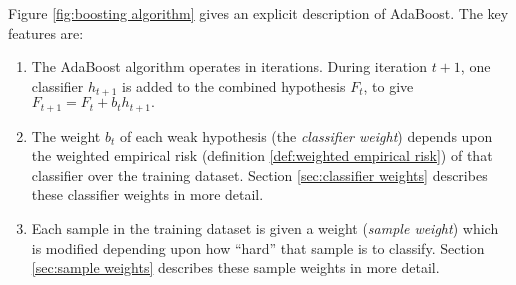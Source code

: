 Figure \ref{fig:boosting algorithm} gives an explicit description of
AdaBoost.  The key features are:
%
\begin{enumerate}
\item	The AdaBoost algorithm operates in iterations.  During
	iteration $t+1$, one classifier $h_{t+1}$ is added to the combined
	hypothesis $F_{t}$, to give $F_{t+1} = F_t + b_t h_{t+1}.$
\item	The weight $b_t$ of each weak hypothesis (the \emph{classifier
	weight}) depends upon the weighted empirical risk
	(definition \ref{def:weighted empirical risk}) of that
	classifier over the training dataset.  Section
	\ref{sec:classifier weights} describes these classifier
	weights in more detail.
\item	Each sample in the training dataset is given a weight
	(\emph{sample weight}) which is modified depending upon how
	``hard'' that sample is to classify.  Section \ref{sec:sample
	weights} describes these sample weights in more detail.
\end{enumerate}

